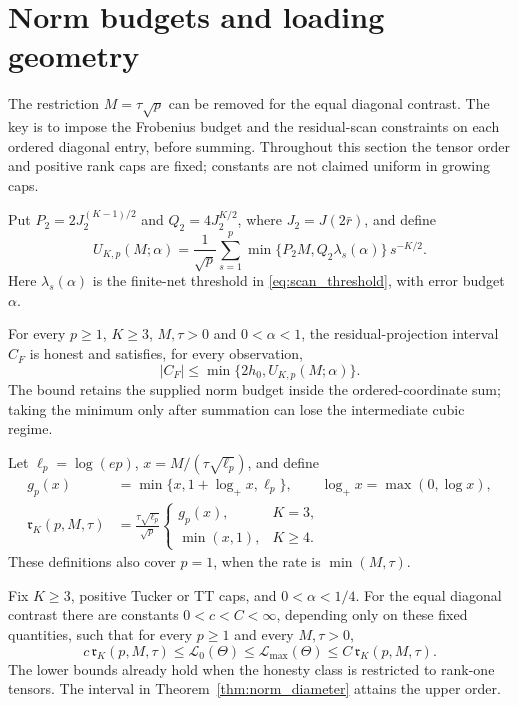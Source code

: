 \section{Norm budgets and loading geometry}\label{sec:norm_loading}

The restriction $M=\tau\sqrt p$ can be removed for the equal diagonal contrast. The key is to impose the Frobenius budget and the residual-scan constraints on each ordered diagonal entry, before summing. Throughout this section the tensor order and positive rank caps are fixed; constants are not claimed uniform in growing caps.

Put $P_2=2J_2^{(K-1)/2}$ and $Q_2=4J_2^{K/2}$, where $J_2=J(2\bar r)$, and define
\begin{equation}\label{eq:norm_diameter}
 U_{K,p}(M;\alpha)=\frac1{\sqrt p}\sum_{s=1}^p
       \min\{P_2M,Q_2\lambda_s(\alpha)\}\,s^{-K/2}.
\end{equation}
Here $\lambda_s(\alpha)$ is the finite-net threshold in \eqref{eq:scan_threshold}, with error budget $\alpha$.

\begin{theorem}\label{thm:norm_diameter}
For every $p\ge1$, $K\ge3$, $M,\tau>0$ and $0<\alpha<1$, the residual-projection interval $C_F$ is honest and satisfies, for every observation,
\[
 |C_F|\le\min\{2h_0,U_{K,p}(M;\alpha)\}.
\]
The bound retains the supplied norm budget inside the ordered-coordinate sum; taking the minimum only after summation can lose the intermediate cubic regime.
\end{theorem}

Let $\ell_p=\log(ep)$, $x=M/(\tau\sqrt{\ell_p})$, and define
\begin{align}
 g_p(x)&=\min\{x,1+\log_+x,\ell_p\},\qquad
          \log_+x=\max(0,\log x),\label{eq:norm_g}\\
 \mathfrak r_K(p,M,\tau)&=\frac{\tau\sqrt{\ell_p}}{\sqrt p}
 \begin{cases}
 g_p(x),&K=3,\\
 \min(x,1),&K\ge4.
 \end{cases}\label{eq:norm_rate}
\end{align}
These definitions also cover $p=1$, when the rate is $\min(M,\tau)$.

\begin{theorem}\label{thm:all_norm_rates}
Fix $K\ge3$, positive Tucker or TT caps, and $0<\alpha<1/4$. For the equal diagonal contrast there are constants $0<c<C<\infty$, depending only on these fixed quantities, such that for every $p\ge1$ and every $M,\tau>0$,
\[
 c\,\mathfrak r_K(p,M,\tau)
 \le\mathcal L_0(\Theta)
 \le\mathcal L_{\max}(\Theta)
 \le C\,\mathfrak r_K(p,M,\tau).
\]
The lower bounds already hold when the honesty class is restricted to rank-one tensors. The interval in Theorem~\ref{thm:norm_diameter} attains the upper order.
\end{theorem}

